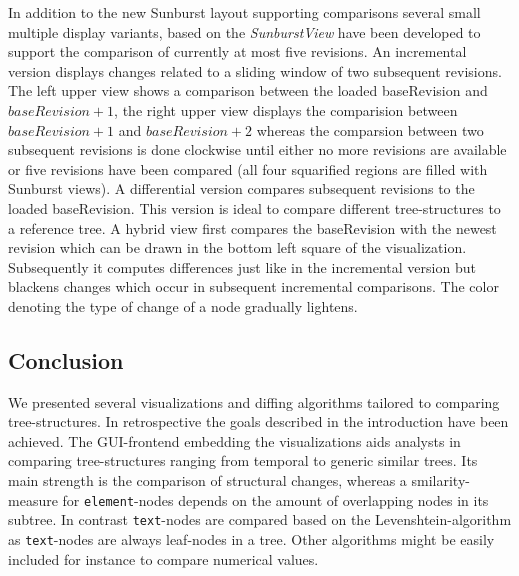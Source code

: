 In addition to the new Sunburst layout supporting comparisons several small multiple display variants, based on the \emph{SunburstView} have been developed to support the comparison of currently at most five revisions. An incremental version displays changes related to a sliding window of two subsequent revisions. The left upper view shows a comparison between the loaded baseRevision and $baseRevision + 1$, the right upper view displays the comparision between $baseRevision + 1$ and $baseRevision + 2$ whereas the comparsion between two subsequent revisions is done clockwise until either no more revisions are available or five revisions have been compared (all four squarified regions are filled with Sunburst views). A differential version compares subsequent revisions to the loaded baseRevision. This version is ideal to compare different tree-structures to a reference tree. A hybrid view first compares the baseRevision with the newest revision which can be drawn in the bottom left square of the visualization. Subsequently it computes differences just like in the incremental version but blackens changes which occur in subsequent incremental comparisons. The color denoting the type of change of a node gradually lightens.

\subsection{Conclusion}
We presented several visualizations and diffing algorithms tailored to comparing tree-structures. In retrospective the goals described in the introduction have been achieved. The GUI-frontend embedding the visualizations aids analysts in comparing tree-structures ranging from temporal to generic similar trees. Its main strength is the comparison of structural changes, whereas a smilarity-measure for \texttt{element}-nodes depends on the amount of overlapping nodes in its subtree. In contrast \texttt{text}-nodes are compared based on the Levenshtein-algorithm as \texttt{text}-nodes are always leaf-nodes in a tree. Other algorithms might be easily included for instance to compare numerical values.

